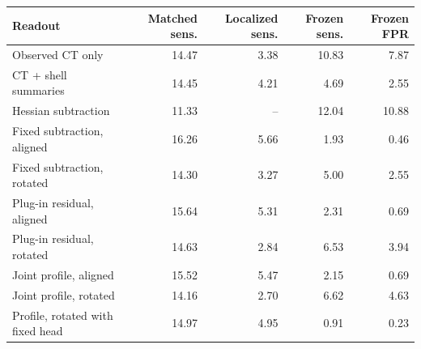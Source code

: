 \begin{tabular}{@{}lrrrr@{}}
\toprule
Readout & Matched sens. & Localized sens. & Frozen sens. & Frozen FPR \\
\midrule
Observed CT only & 14.47 & 3.38 & 10.83 & 7.87 \\
CT + shell summaries & 14.45 & 4.21 & 4.69 & 2.55 \\
Hessian subtraction & 11.33 & -- & 12.04 & 10.88 \\
Fixed subtraction, aligned & 16.26 & 5.66 & 1.93 & 0.46 \\
Fixed subtraction, rotated & 14.30 & 3.27 & 5.00 & 2.55 \\
Plug-in residual, aligned & 15.64 & 5.31 & 2.31 & 0.69 \\
Plug-in residual, rotated & 14.63 & 2.84 & 6.53 & 3.94 \\
Joint profile, aligned & 15.52 & 5.47 & 2.15 & 0.69 \\
Joint profile, rotated & 14.16 & 2.70 & 6.62 & 4.63 \\
Profile, rotated with fixed head & 14.97 & 4.95 & 0.91 & 0.23 \\
\bottomrule
\end{tabular}
